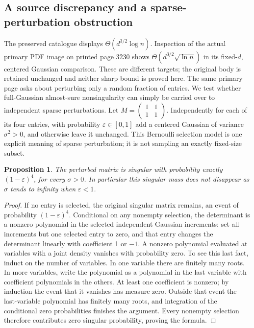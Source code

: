 \documentclass[11pt]{article}
\newtheorem{proposition}{Proposition}
\begin{document}
\subsection{A source discrepancy and a sparse-perturbation obstruction}
The preserved catalogue displays $\Theta(d^{3/2}\log n)$. Inspection of the actual primary PDF image on printed page 3230 shows $\Theta(d^{3/2}\sqrt{\ln n})$ in its fixed-$d$, centered Gaussian comparison. These are different targets; the original body is retained unchanged and neither sharp bound is proved here. The same primary page asks about perturbing only a random fraction of entries. We test whether full-Gaussian almost-sure nonsingularity can simply be carried over to independent sparse perturbations.
Let $M=\begin{pmatrix}1&1\\1&1\end{pmatrix}$. Independently for each of its four entries, with probability $\varepsilon\in[0,1]$ add a centered Gaussian of variance $\sigma^2>0$, and otherwise leave it unchanged. This Bernoulli selection model is one explicit meaning of sparse perturbation; it is not sampling an exactly fixed-size subset.
\begin{proposition}
The perturbed matrix is singular with probability exactly $(1-\varepsilon)^4$, for every $\sigma>0$. In particular this singular mass does not disappear as $\sigma$ tends to infinity when $\varepsilon<1$.
\end{proposition}
\begin{proof}
If no entry is selected, the original singular matrix remains, an event of probability $(1-\varepsilon)^4$. Conditional on any nonempty selection, the determinant is a nonzero polynomial in the selected independent Gaussian increments: set all increments but one selected entry to zero, and that entry changes the determinant linearly with coefficient 1 or $-1$. A nonzero polynomial evaluated at variables with a joint density vanishes with probability zero. To see this last fact, induct on the number of variables. In one variable there are finitely many roots. In more variables, write the polynomial as a polynomial in the last variable with coefficient polynomials in the others. At least one coefficient is nonzero; by induction the event that it vanishes has measure zero. Outside that event the last-variable polynomial has finitely many roots, and integration of the conditional zero probabilities finishes the argument. Every nonempty selection therefore contributes zero singular probability, proving the formula.
\end{proof}
\end{document}
